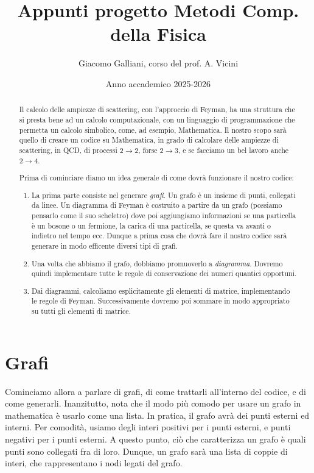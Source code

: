 \documentclass{report}
\title{\Huge{\textbf{Appunti progetto Metodi Comp. della Fisica}}}
\author{Giacomo Galliani, corso del prof. A. Vicini}
\date{Anno accademico 2025-2026}
\renewcommand{\contentsname}{Indice}
\begin{document}
\maketitle
\newpage%
\pdfbookmark[section]{\contentsname}{toc}
\tableofcontents
\pagebreak

\begin{abstract}
    Il calcolo delle ampiezze di scattering, con l'approccio di Feyman, ha una struttura che si presta bene ad un calcolo computazionale, con un linguaggio di programmazione che permetta un calcolo simbolico, come, ad esempio, Mathematica. Il nostro scopo sarà quello di creare un codice su Mathematica, in grado di calcolare delle ampiezze di scattering, in QCD, di processi \(2 \rightarrow 2\), forse \(2 \rightarrow 3\), e se facciamo un bel lavoro anche \(2 \rightarrow 4\). 

    Prima di cominciare diamo un idea generale di come dovrà funzionare il nostro codice: 

    \begin{enumerate}
        \item La prima parte consiste nel generare \emph{grafi}. Un grafo è un insieme di punti, collegati da linee. Un diagramma di Feyman è costruito a partire da un grafo (possiamo pensarlo come il suo scheletro) dove poi aggiungiamo informazioni se una particella è un bosone o un fermione, la carica di una particella, se questa va avanti o indietro nel tempo ecc. Dunque a prima cosa che dovrà fare il nostro codice sarà generare in modo efficente diversi tipi di grafi. 
        \item Una volta che abbiamo il grafo, dobbiamo promuoverlo a \emph{diagramma}. Dovremo quindi implementare tutte le regole di conservazione dei numeri quantici opportuni. 
        \item Dai diagrammi, calcoliamo esplicitamente gli elementi di matrice, implementando le regole di Feyman. Successivamente dovremo poi sommare in modo appropriato su tutti gli elementi di matrice. 
    \end{enumerate}
\end{abstract}



\chapter{Grafi}

Cominciamo allora a parlare di grafi, di come trattarli all'interno del codice, e di come generarli. Inanzitutto, nota che il modo più comodo per usare un grafo in mathematica è usarlo come una lista. In pratica, il grafo avrà dei punti esterni ed interni. Per comodità, usiamo degli interi positivi per i punti esterni, e punti negativi per i punti esterni. A questo punto, ciò che caratterizza un grafo è quali punti sono collegati fra di loro. Dunque, un grafo sarà una lista di coppie di interi, che rappresentano i nodi legati del grafo.  
\end{document}
